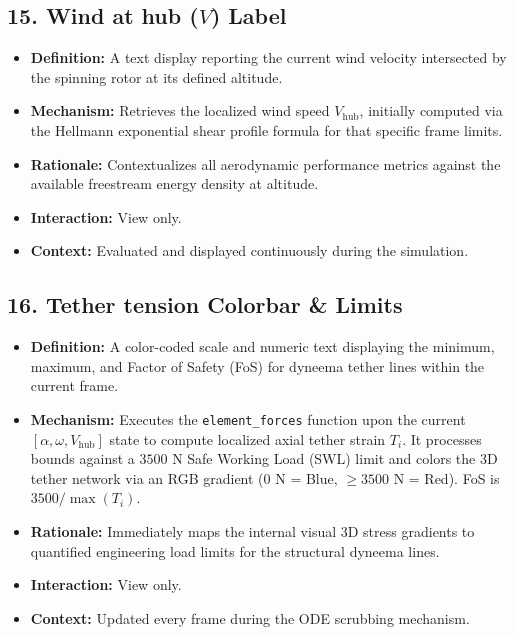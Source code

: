 \documentclass[11pt,a4paper]{article}
\begin{document}
\subsection{15. Wind at hub ($V$) Label}
\begin{itemize}
    \item \textbf{Definition:} A text display reporting the current wind velocity intersected by the spinning rotor at its defined altitude.
    \item \textbf{Mechanism:} Retrieves the localized wind speed $V_{\text{hub}}$, initially computed via the Hellmann exponential shear profile formula for that specific frame limits.
    \item \textbf{Rationale:} Contextualizes all aerodynamic performance metrics against the available freestream energy density at altitude.
    \item \textbf{Interaction:} View only.
    \item \textbf{Context:} Evaluated and displayed continuously during the simulation.
\end{itemize}

\subsection{16. Tether tension Colorbar \& Limits}
\begin{itemize}
    \item \textbf{Definition:} A color-coded scale and numeric text displaying the minimum, maximum, and Factor of Safety (FoS) for dyneema tether lines within the current frame.
    \item \textbf{Mechanism:} Executes the \texttt{element\_forces} function upon the current $[\alpha, \omega, V_{\text{hub}}]$ state to compute localized axial tether strain $T_i$. It processes bounds against a $3500$ N Safe Working Load (SWL) limit and colors the 3D tether network via an RGB gradient ($0$ N = Blue, $\ge 3500$ N = Red). FoS is $3500 / \max(T_i)$.
    \item \textbf{Rationale:} Immediately maps the internal visual 3D stress gradients to quantified engineering load limits for the structural dyneema lines.
    \item \textbf{Interaction:} View only.
    \item \textbf{Context:} Updated every frame during the ODE scrubbing mechanism.
\end{itemize}
\end{document}
